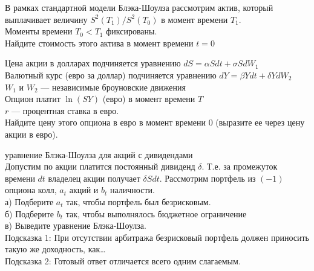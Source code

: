 \begin{problem}
В рамках стандартной модели Блэка-Шоулза рассмотрим актив, который выплачивает величину $S^{2}(T_{1})/S^{2}(T_{0})$ в момент времени $T_{1}$. \\
Моменты времени $T_{0}<T_{1}$ фиксированы. \\
Найдите стоимость этого актива в момент времени $t=0$ 
\end{problem} 
\begin{solution} 

\end{solution}

\begin{problem}
Цена акции в долларах подчиняется уравнению $dS=\alpha Sdt+\sigma SdW_{1}$ \\
Валютный курс (евро за доллар) подчиняется уравнению $dY=\beta Ydt+\delta YdW_{2}$ \\
$W_{1}$ и $W_{2}$ --- независимые броуновские движения \\
Опцион платит $\ln(SY)$ (евро) в момент времени $T$ \\
$r$ --- процентная ставка в евро. \\
Найдите цену этого опциона в евро в момент времени $0$ (выразите ее через цену акции в евро). 
\end{problem} 
\begin{solution} 

\end{solution}

\begin{problem}
 уравнение Блэка-Шоулза для акций с дивидендами \\
Допустим по акции платится постоянный дивиденд $\delta$. Т.е. за промежуток времени $dt$ владелец акции получает $\delta Sdt$. Рассмотрим портфель из $(-1)$ опциона колл, $a_{t}$ акций и $b_{t}$ наличности. \\
а) Подберите $a_{t}$ так, чтобы портфель был безрисковым. \\
б) Подберите $b_{t}$ так, чтобы выполнялось бюджетное ограничение \\
в) Выведите уравнение Блэка-Шоулза. \\
Подсказка 1: При отсутствии арбитража безрисковый портфель должен приносить такую же доходность, как\ldots \\
Подсказка 2: Готовый ответ отличается всего одним слагаемым. 
\end{problem} 
\begin{solution} 

\end{solution}

